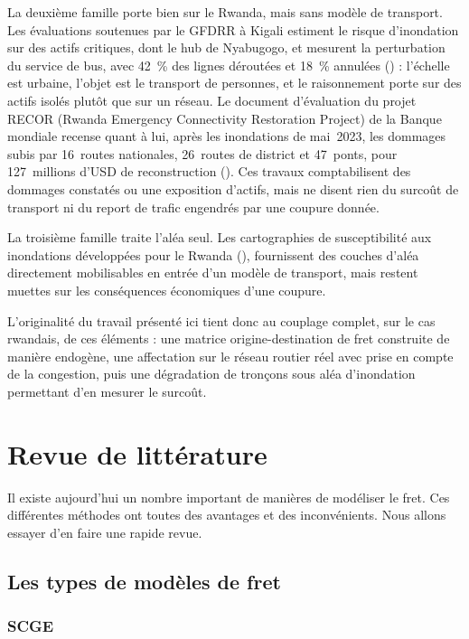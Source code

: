 \documentclass[12pt,a4paper,french]{report}
\begin{document}
	La deuxième famille porte bien sur le Rwanda, mais sans modèle de transport. Les évaluations soutenues par le GFDRR à Kigali estiment le risque d'inondation sur des actifs critiques, dont le hub de Nyabugogo, et mesurent la perturbation du service de bus, avec 42~\% des lignes déroutées et 18~\% annulées (\cite{GFDRRRwanda}) : l'échelle est urbaine, l'objet est le transport de personnes, et le raisonnement porte sur des actifs isolés plutôt que sur un réseau. Le document d'évaluation du projet RECOR (Rwanda Emergency Connectivity Restoration Project) de la Banque mondiale recense quant à lui, après les inondations de mai~2023, les dommages subis par 16~routes nationales, 26~routes de district et 47~ponts, pour 127~millions d'USD de reconstruction (\cite{WorldBank2024RECOR}). Ces travaux comptabilisent des dommages constatés ou une exposition d'actifs, mais ne disent rien du surcoût de transport ni du report de trafic engendrés par une coupure donnée.

	La troisième famille traite l'aléa seul. Les cartographies de susceptibilité aux inondations développées pour le Rwanda (\cite{Hategekimana2026}), fournissent des couches d'aléa directement mobilisables en entrée d'un modèle de transport, mais restent muettes sur les conséquences économiques d'une coupure.

	L'originalité du travail présenté ici tient donc au couplage complet, sur le cas rwandais, de ces éléments : une matrice origine-destination de fret construite de manière endogène, une affectation sur le réseau routier réel avec prise en compte de la congestion, puis une dégradation de tronçons sous aléa d'inondation permettant d'en mesurer le surcoût. 

	
		\newpage
	

	\chapter{Revue de littérature}
	
	Il existe aujourd'hui un nombre important de manières de modéliser le fret. Ces différentes méthodes ont toutes des avantages et des inconvénients. Nous allons essayer d'en faire une rapide revue.
	
	\section {Les types de modèles de fret}
	\label{sec:type_modele}
	
	\subsection {SCGE}
	\label{subsec:SCGE}
	
\end{document}
